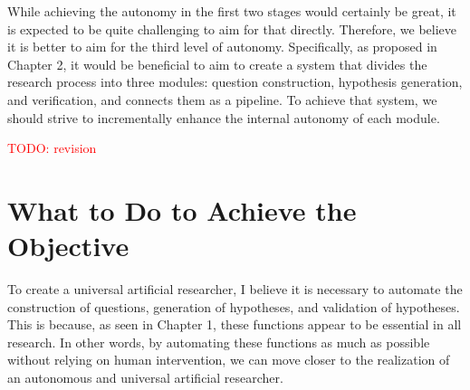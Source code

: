 \documentclass{book}
\begin{document}
While achieving the autonomy in the first two stages would certainly be great, it is expected to be quite challenging to aim for that directly. Therefore, we believe it is better to aim for the third level of autonomy. Specifically, as proposed in Chapter 2, it would be beneficial to aim to create a system that divides the research process into three modules: question construction, hypothesis generation, and verification, and connects them as a pipeline. To achieve that system, we should strive to incrementally enhance the internal autonomy of each module.

\textcolor{red}{TODO: revision}

\section{What to Do to Achieve the Objective}

To create a universal artificial researcher, I believe it is necessary to automate the construction of questions, generation of hypotheses, and validation of hypotheses. This is because, as seen in Chapter 1, these functions appear to be essential in all research. In other words, by automating these functions as much as possible without relying on human intervention, we can move closer to the realization of an autonomous and universal artificial researcher.



\end{document}
